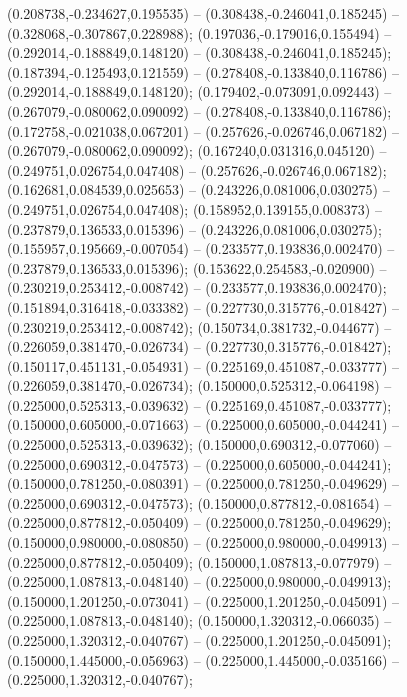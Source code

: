  (0.208738,-0.234627,0.195535) -- (0.308438,-0.246041,0.185245) -- (0.328068,-0.307867,0.228988);
 (0.197036,-0.179016,0.155494) -- (0.292014,-0.188849,0.148120) -- (0.308438,-0.246041,0.185245);
 (0.187394,-0.125493,0.121559) -- (0.278408,-0.133840,0.116786) -- (0.292014,-0.188849,0.148120);
 (0.179402,-0.073091,0.092443) -- (0.267079,-0.080062,0.090092) -- (0.278408,-0.133840,0.116786);
 (0.172758,-0.021038,0.067201) -- (0.257626,-0.026746,0.067182) -- (0.267079,-0.080062,0.090092);
 (0.167240,0.031316,0.045120) -- (0.249751,0.026754,0.047408) -- (0.257626,-0.026746,0.067182);
 (0.162681,0.084539,0.025653) -- (0.243226,0.081006,0.030275) -- (0.249751,0.026754,0.047408);
 (0.158952,0.139155,0.008373) -- (0.237879,0.136533,0.015396) -- (0.243226,0.081006,0.030275);
 (0.155957,0.195669,-0.007054) -- (0.233577,0.193836,0.002470) -- (0.237879,0.136533,0.015396);
 (0.153622,0.254583,-0.020900) -- (0.230219,0.253412,-0.008742) -- (0.233577,0.193836,0.002470);
 (0.151894,0.316418,-0.033382) -- (0.227730,0.315776,-0.018427) -- (0.230219,0.253412,-0.008742);
 (0.150734,0.381732,-0.044677) -- (0.226059,0.381470,-0.026734) -- (0.227730,0.315776,-0.018427);
 (0.150117,0.451131,-0.054931) -- (0.225169,0.451087,-0.033777) -- (0.226059,0.381470,-0.026734);
 (0.150000,0.525312,-0.064198) -- (0.225000,0.525313,-0.039632) -- (0.225169,0.451087,-0.033777);
 (0.150000,0.605000,-0.071663) -- (0.225000,0.605000,-0.044241) -- (0.225000,0.525313,-0.039632);
 (0.150000,0.690312,-0.077060) -- (0.225000,0.690312,-0.047573) -- (0.225000,0.605000,-0.044241);
 (0.150000,0.781250,-0.080391) -- (0.225000,0.781250,-0.049629) -- (0.225000,0.690312,-0.047573);
 (0.150000,0.877812,-0.081654) -- (0.225000,0.877812,-0.050409) -- (0.225000,0.781250,-0.049629);
 (0.150000,0.980000,-0.080850) -- (0.225000,0.980000,-0.049913) -- (0.225000,0.877812,-0.050409);
 (0.150000,1.087813,-0.077979) -- (0.225000,1.087813,-0.048140) -- (0.225000,0.980000,-0.049913);
 (0.150000,1.201250,-0.073041) -- (0.225000,1.201250,-0.045091) -- (0.225000,1.087813,-0.048140);
 (0.150000,1.320312,-0.066035) -- (0.225000,1.320312,-0.040767) -- (0.225000,1.201250,-0.045091);
 (0.150000,1.445000,-0.056963) -- (0.225000,1.445000,-0.035166) -- (0.225000,1.320312,-0.040767);
